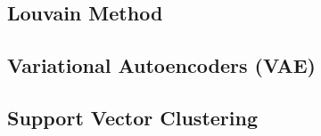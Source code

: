 \subsection{Louvain Method}
\label{additional:unsupervised:louvain}

\subsection{Variational Autoencoders (VAE)}
\label{additional:unsupervised:VAE}

\subsection{Support Vector Clustering}
\label{additional:unsupervised:SVC}

